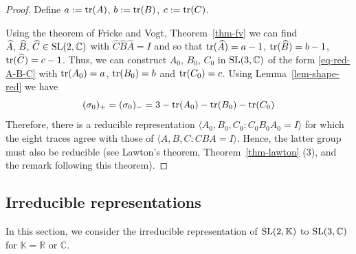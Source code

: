 \documentclass[11pt]{amsart}
\numberwithin{equation}{section}
\begin{document}
\begin{proof}
Define $a:={\rm tr}(A)$, $b:={\rm tr}(B)$, $c:={\rm tr}(C)$. 

Using the theorem of Fricke and Vogt, Theorem~\ref{thm-fv} we can find 
$\widehat{A},\,\widehat{B},\,\widehat{C}\in{\rm SL}(2,{\mathbb C})$ with $\widehat{C}\widehat{B}\widehat{A}=I$ 
and so that ${\rm tr}(\widehat{A})=a-1$, ${\rm tr}(\widehat{B})=b-1$, ${\rm tr}(\widehat{C})=c-1$. 
Thus, we can construct 
$A_0$, $B_0$, $C_0$ in ${\rm SL}(3,{\mathbb C})$ of the form \eqref{eq-red-A-B-C} with 
${\rm tr}(A_0)=a$, ${\rm tr}(B_0)=b$ and ${\rm tr}(C_0)=c$.  
Using Lemma~\ref{lem-shape-red} we have
$$
(\sigma_0)_+ =(\sigma_0)_- = 3-{\rm tr}(A_0)-{\rm tr}(B_0)-{\rm tr}(C_0) \\
$$
Therefore, there is a reducible representation $\langle A_0,B_0,C_0:C_0B_0A_0=I\rangle$ for which the eight traces 
agree with those of $\langle A,B,C:CBA=I\rangle$. Hence, the latter group must also be reducible (see 
Lawton's theorem, Theorem~\ref{thm-lawton} (3), and the remark following this theorem). 
\end{proof}

\medskip 

\subsection{Irreducible representations}\label{sec-irred}

In this section, we consider the irreducible representation of ${\rm SL}(2,{\mathbb K})$ to ${\rm SL}(3,{\mathbb C})$ for
${\mathbb K}={\mathbb R}$ or ${\mathbb C}$.  
\end{document}
